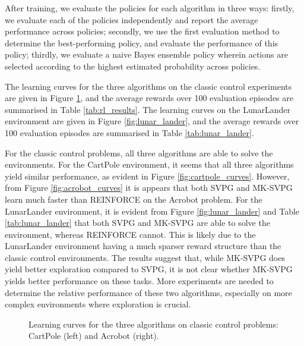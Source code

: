 After training, we evaluate the policies for each algorithm in three ways: firstly, we evaluate each of the policies independently and report the average performance across policies; secondly, we use the first evaluation method to determine the best-performing policy, and evaluate the performance of this policy; thirdly, we evaluate a naive Bayes ensemble policy wherein actions are selected according to the highest estimated probability across policies. 

The learning curves for the three algorithms on the classic control experiments are given in Figure \ref{fig:learning_curves}, and the average rewards over 100 evaluation episodes are summarised in Table \ref{tab:rl_results}. The learning curves on the LunarLander environment are given in Figure \ref{fig:lunar_lander}, and the average rewards over 100 evaluation episodes are summarised in Table \ref{tab:lunar_lander}.

For the classic control problems, all three algorithms are able to solve the environments. For the CartPole environment, it seems that all three algorithms yield similar performance, as evident in Figure \ref{fig:cartpole_curves}. However, from Figure \ref{fig:acrobot_curves} it is appears that both SVPG and MK-SVPG learn much faster than REINFORCE on the Acrobot problem. For the LunarLander environment, it is evident from Figure \ref{fig:lunar_lander} and Table \ref{tab:lunar_lander} that both SVPG and MK-SVPG are able to solve the environment, whereas REINFORCE cannot. This is likely due to the LunarLander environment having a much sparser reward structure than the classic control environments. The results suggest that, while MK-SVPG does yield better exploration compared to SVPG, it is not clear whether MK-SVPG yields better performance on these tasks. More experiments are needed to determine the relative performance of these two algorithms, especially on more complex environments where exploration is crucial.

\begin{figure}[h!]
	\centering
	\qquad \quad
	\caption{\label{fig:learning_curves} Learning curves for the three algorithms on classic control problems: CartPole (left) and Acrobot (right).}
\end{figure}


